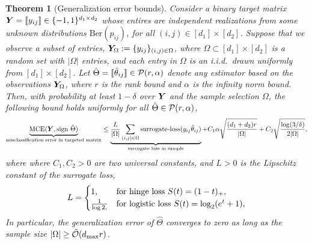 \documentclass[11pt]{article}
\theoremstyle{plain}
\newtheorem{thm}{Theorem}[section]
\theoremstyle{definition}
\def\sign{\textup{sign }}
\newcommand*{\KeepStyleUnderBrace}[1]{%
  \mathop{%
    \mathchoice
    {\underbrace{\displaystyle#1}}%
    {\underbrace{\textstyle#1}}%
    {\underbrace{\scriptstyle#1}}%
    {\underbrace{\scriptscriptstyle#1}}%
  }\limits
}
\begin{document}
\begin{thm}[Generalization error bounds]\label{thm:main}
Consider a binary target matrix $\bm Y=\llbracket y_{ij} \rrbracket\in\{-1,1\}^{d_1\times d_2}$ whose entires are independent realizations from some unknown distributions $\text{Ber}(p_{ij})$, for all $(i,j)\in[d_1]\times[d_2]$. Suppose that we observe a subset of entries, $\bm Y_\Omega:=\{y_{ij}\}_{(i,j)\in\Omega}$, where $\Omega\subset[d_1]\times[d_2]$ is a random set with $|\Omega|$ entries, and each entry in $\Omega$ is an i.i.d.\ drawn uniformly from $[d_1]\times[d_2]$. Let $\hat \Theta=\llbracket \hat \theta_{ij} \rrbracket\in\mathcal{P}(r,\alpha)$ denote any estimator based on the observations $\bm Y_\Omega$, where $r$ is the rank bound and $\alpha$ is the infinity norm bound. Then, with probability at least $1-\delta$ over $\bm Y$ and the sample selection $\Omega$, the following bound holds uniformly for all $\hat \Theta \in \mathcal{P}(r,\alpha)$,
\begin{equation}\label{eq:conclusion}
\KeepStyleUnderBrace{\textup{MCE}(\mY, \sign\hat \Theta)}_{\text{misclassification error in targeted matrix}} \leq \KeepStyleUnderBrace{{L\over |\Omega|}\sum_{(i,j)\in \Omega} \textup{surrogate-loss}(y_{ij}\hat \theta_{ij})}_{\text{surrogate loss in sample}}+C_1\alpha\sqrt{(d_1+d_2)r\over |\Omega|}+C_2\sqrt{\log(3/\delta)\over 2|\Omega|},
\end{equation}
where where $C_1,C_2>0$ are two universal constants, and $L>0$ is the Lipschitz constant of the surrogate loss,
\[
L=\begin{cases}
1,& \text{for hinge loss }S(t)=(1-t)_{+},\\
1\over \log 2,& \text{for logistic loss }S(t)=\log_2(e^t+1),
\end{cases}
\]
In particular, the generalization error of $\hat \Theta$ converges to zero as long as the sample size $|\Omega|\geq \tilde {\mathcal{O}}(d_{\max}r)$.
\end{thm}
\end{document}
